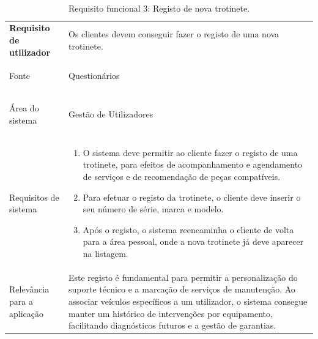 \documentclass[a4paper,12pt]{scrreprt}
\begin{document}
\paragraph{}


\begin{table}[H]
    \centering
    \renewcommand{\arraystretch}{1.5} 
    
    \begin{tabular}{|>{\columncolor{gray!15}\bfseries}p{4cm}|p{10.5cm}|}
        \hline
        Requisito de utilizador & Os clientes devem conseguir fazer o registo de uma nova trotinete. \\ \hdashline
        
        Fonte & Questionários \\ \hdashline
        
        Área do sistema & Gestão de Utilizadores \\ \hdashline
        
        Requisitos de sistema & 
        \begin{enumerate}[leftmargin=*, nosep, topsep=2pt, partopsep=0pt]
            \item O sistema deve permitir ao cliente fazer o registo de uma trotinete, para efeitos de acompanhamento e agendamento de serviços e de recomendação de peças compatíveis.
            \item Para efetuar o registo da trotinete, o cliente deve inserir o seu número de série, marca e modelo.
            \item Após o registo, o sistema reencaminha o cliente de volta para a área pessoal, onde a nova trotinete já deve aparecer na listagem.
        \end{enumerate} \\ \hdashline
        
        Relevância para a aplicação & Este registo é fundamental para permitir a personalização do suporte técnico e a marcação de serviços de manutenção. Ao associar veículos específicos a um utilizador, o sistema consegue manter um histórico de intervenções por equipamento, facilitando diagnósticos futuros e a gestão de garantias.\\ \hline
    \end{tabular}
    \caption{Requisito funcional 3: Registo de nova trotinete.}
    \label{tab:rf3}
\end{table}
\end{document}
